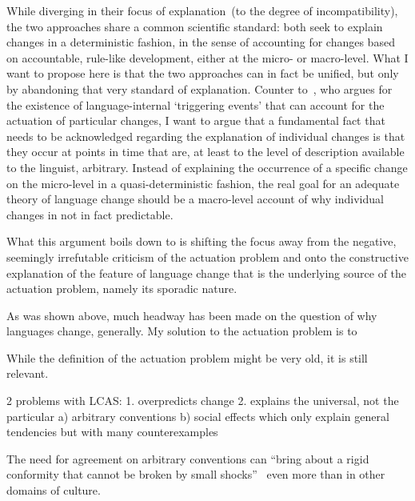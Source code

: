 While diverging in their focus of explanation~(to the degree of incompatibility), the two approaches share a common scientific standard: both seek to explain changes in a deterministic fashion, in the sense of accounting for changes based on accountable, rule-like development, either at the micro- or macro-level. What I want to propose here is that the two approaches can in fact be unified, but only by abandoning that very standard of explanation.
Counter to~\citet[ch.5]{Labov2010}, who argues for the existence of language-internal `triggering events' that can account for the actuation of particular changes, I want to argue that a fundamental fact that needs to be acknowledged regarding the explanation of individual changes is that they occur at points in time that are, at least to the level of description available to the linguist, arbitrary. Instead of explaining the occurrence of a specific change on the micro-level in a quasi-deterministic fashion, the real goal for an adequate theory of language change should be a macro-level account of why individual changes in not in fact predictable.

What this argument boils down to is shifting the focus away from the negative, seemingly irrefutable criticism of the actuation problem and onto the constructive explanation of the feature of language change that is the underlying source of the actuation problem, namely its sporadic nature.

As was shown above, much headway has been made on the question of why languages change, generally. My solution to the actuation problem is to 


While the definition of the actuation problem might be very old, it is still relevant.

2 problems with LCAS:
1. overpredicts change
2. explains the universal, not the particular
a) arbitrary conventions
b) social effects which only explain general tendencies but with many counterexamples



The need for agreement on arbitrary conventions can ``bring about a rigid conformity that cannot be broken by small shocks''~\citep{Bikhchandani1992} even more than in other domains of culture.

